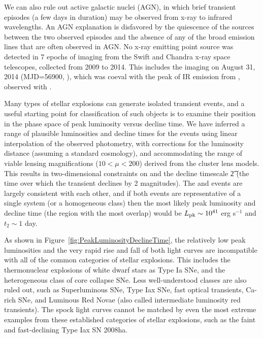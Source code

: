 We can also rule out active galactic nuclei (AGN), in which brief
transient episodes (a few days in duration) may be observed from x-ray
to infrared wavelengths\cite{Gaskell:2003}. An AGN explanation is
disfavored by the quiescence of the \spock sources between the two
observed episodes and the absence of any of the broad emission lines
that are often observed in AGN.  No x-ray emitting point source was
detected in 7 epochs of imaging from the Swift and Chandra x-ray space
telescopes, collected from 2009 to 2014.  This includes the \Chandra
imaging on August 31, 2014 (MJD=56900,
), which was coeval
  with the peak of IR emission from \spocktwo, observed with \HST.

Many types of stellar explosions can generate isolated transient
events, and a useful starting point for classification of such objects
is to examine their position in the phase space of peak luminosity
versus decline time\cite{Kulkarni:2007}. We have inferred a range of
plausible luminosities and decline times for the \spock events using
linear interpolation of the observed photometry, with corrections for
the luminosity distance (assuming a standard \LCDM cosmology), and
accommodating the range of viable lensing magnifications
($10<\mu<200$) derived from the cluster lens models. This results in
two-dimensional constraints on \Lpk and the decline timescale \t2 (the
time over which the transient declines by 2 magnitudes). The \spockone
and \spocktwo events are largely consistent with each other, and if
both events are representative of a single system (or a homogeneous
class) then the most likely peak luminosity and decline time (the
region with the most overlap) would be $L_{\rm pk}\sim10^{41}$ erg
s$^{-1}$ and $t_2\sim1$ day.

As shown in Figure~\ref{fig:PeakLuminosityDeclineTime}, the relatively
low peak luminosities and the very rapid rise and fall of both \spock
light curves are incompatible with all of the common categories of
stellar explosions. This includes the thermonuclear explosions of
white dwarf stars as Type Ia SNe, and the heterogeneous class of core
collapse SNe.  Less well-understood classes are also ruled out, such
as Superluminous SNe\cite{Gal-Yam:2012,Arcavi:2016}, Type Iax SNe\cite{Li:2003,Jha:2006a,Foley:2013a}, fast optical transients\cite{Drout:2014}, Ca-rich SNe\cite{Filippenko:2003,Perets:2011,Kasliwal:2012}, and Luminous Red
Novae (also called intermediate luminosity red
  transients)\cite{Munari:2002,Kulkarni:2007,Kasliwal:2011b}.  The spock
light curves cannot be matched by even the most extreme examples from
these established categories of stellar explosions, such as the faint
and fast-declining Type Iax SN 2008ha\cite{Foley:2009a}.


